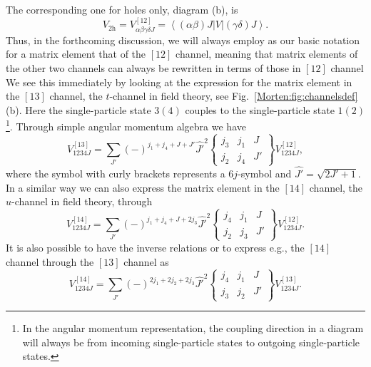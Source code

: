 The corresponding one for holes only, diagram (b), is
\begin{equation}
      V_{\mathrm{2h}}=V_{\alpha\beta\gamma\delta J}^{[12]}=
       \left\langle (\alpha\beta)J\right | V
       \left | (\gamma\delta)J\right\rangle.
       \label{Morten:eq:2hv}
\end{equation}
Thus, in the forthcoming discussion, we will always employ as our
basic notation for a matrix element that of the $[12]$ channel,
meaning that matrix elements of the other two channels can always be
rewritten in terms of those in $[12]$ channel We see this immediately
by looking at the expression for the matrix element in the $[13]$
channel, the $t$-channel in field theory, see
Fig.~\ref{Morten:fig:channelsdef}(b). Here the single-particle state
$3(4)$ couples to the single-particle state $1(2)$\footnote{In the 
angular momentum representation, the
coupling direction in a diagram 
will always be from incoming single-particle states
to outgoing single-particle states.}.  Through simple angular momentum
algebra we have
\begin{equation}
      V_{1234J}^{[13]}=
      {\displaystyle \sum_{J'}}(-)^{j_1+j_4+J+J'}\hat{J'}^2
      \left\{
      \begin{array}{ccc}
       j_3&j_1&J\\j_2&j_4&J'
      \end{array}
       \right\}V_{1234J}^{[12]},
       \label{Morten:eq:13channel}
\end{equation}
where the symbol with curly brackets represents a $6j$-symbol and
$\hat{J'}=\sqrt{2J'+1}$.
In a similar way we can also express the matrix
element in the $[14]$ channel, the $u$-channel in field theory,
through  
\begin{equation}
       V_{1234J}^{[14]}=
      {\displaystyle \sum_{J'}}(-)^{j_1+j_4+J+2j_3}\hat{J'}^2
      \left\{
      \begin{array}{ccc}
       j_4&j_1&J\\j_2&j_3&J'
      \end{array}
       \right\}
       V_{1234J}^{[12]}.
       \label{Morten:eq:14channel}
\end{equation}
It is also possible to have the inverse relations or to express
e.g., the $[14]$ channel through the $[13]$ channel as
\begin{equation}
       V_{1234J}^{[14]}=
      {\displaystyle \sum_{J'}}(-)^{2j_1+2j_2+2j_3}\hat{J'}^2
      \left\{
      \begin{array}{ccc}
       j_4&j_1&J\\j_3&j_2&J'
      \end{array}
       \right\}
       V_{1234J}^{[13]}.
       \label{Morten:eq:1413channel}
\end{equation}
